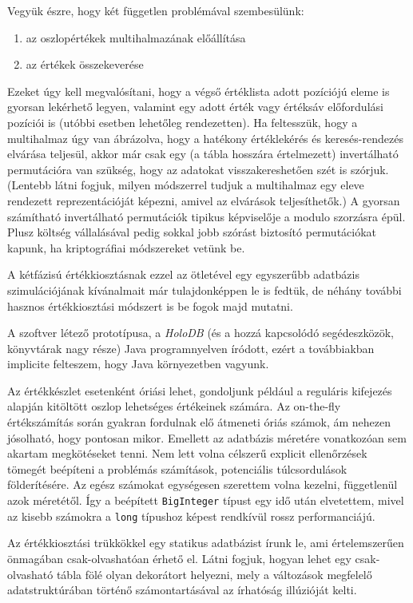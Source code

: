 \documentclass[
    parspace,
    noindent,
    nohyp,
]{elteiktdk}[2023/04/10]
\begin{document}
Vegyük észre, hogy két független problémával szembesülünk:

\begin{enumerate}
    \item az oszlopértékek multihalmazának előállítása
    \item az értékek összekeverése
\end{enumerate}

Ezeket úgy kell megvalósítani, hogy a végső értéklista adott pozíciójú eleme is gyorsan lekérhető legyen,
valamint egy adott érték vagy értéksáv előfordulási pozíciói is
(utóbbi esetben lehetőleg rendezetten).
Ha feltesszük, hogy a multihalmaz úgy van ábrázolva,
hogy a hatékony értéklekérés és keresés-rendezés elvárása teljesül,
akkor már csak egy (a tábla hosszára értelmezett) invertálható permutációra van szükség,
hogy az adatokat visszakereshetően szét is szórjuk.
(Lentebb látni fogjuk, milyen módszerrel tudjuk a multihalmaz egy eleve rendezett reprezentációját képezni,
amivel az elvárások teljesíthetők.)
A gyorsan számítható invertálható permutációk tipikus képviselője a modulo szorzásra épül.
Plusz költség vállalásával pedig sokkal jobb szórást biztosító permutációkat kapunk,
ha kriptográfiai módszereket vetünk be.

A kétfázisú értékkiosztásnak ezzel az ötletével
egy egyszerűbb adatbázis szimulációjának kívánalmait már tulajdonképpen le is fedtük,
de néhány további hasznos értékkiosztási módszert is be fogok majd mutatni.

A szoftver létező prototípusa, a \textit{HoloDB}
(és a hozzá kapcsolódó segédeszközök, könyvtárak nagy része) Java programnyelven íródott,
ezért a továbbiakban implicite felteszem, hogy Java környezetben vagyunk.

Az értékkészlet esetenként óriási lehet,
gondoljunk például a reguláris kifejezés alapján kitöltött oszlop lehetséges értékeinek számára.
Az on-the-fly értékszámítás során gyakran fordulnak elő átmeneti óriás számok,
ám nehezen jósolható, hogy pontosan mikor.
Emellett az adatbázis méretére vonatkozóan sem akartam megkötéseket tenni.
Nem lett volna célszerű explicit ellenőrzések tömegét beépíteni
a problémás számítások, potenciális túlcsordulások földerítésére.
Az egész számokat egységesen szerettem volna kezelni, függetlenül azok méretétől.
Így a beépített \texttt{BigInteger} típust egy idő után elvetettem,
mivel az kisebb számokra a \texttt{long} típushoz képest rendkívül rossz performanciájú.

Az értékkiosztási trükkökkel egy statikus adatbázist írunk le,
ami értelemszerűen önmagában csak-olvashatóan érhető el.
Látni fogjuk, hogyan lehet egy csak-olvasható tábla fölé olyan dekorátort helyezni,
mely a változások megfelelő adatstruktúrában történő számontartásával
az írhatóság illúzióját kelti.
\end{document}
